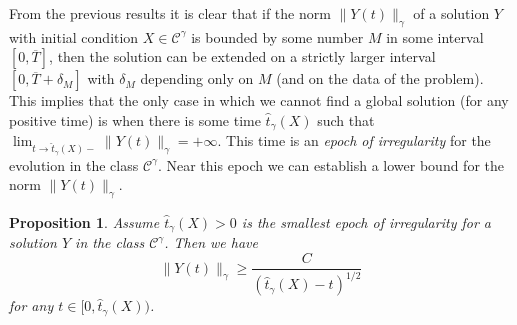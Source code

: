 \documentclass[a4paper,12pt,reqno]{amsart}
\newtheorem{proposition}{Proposition}
\newcommand{\CC}{\mathscr{C}}
\begin{document}
From the previous results it is clear that if the norm
$\|Y(t)\|_{\gamma}$ of a solution $Y$ with initial condition $X \in \CC^\gamma$ is bounded by some number $M$  in some interval
$[0,\overline T]$, then the solution can be extended on a strictly
larger interval $[0,\overline T + \delta_M]$ with $\delta_M$ depending
only on $M$ (and on the data of the problem). This implies that the
only case in which we cannot find a global solution (for any positive
time) is when there is some time $\hat t_\gamma(X)$ such that $\lim_{t\to \hat t_\gamma(X)
  -} \|Y(t)\|_{\gamma} = +\infty$. This time is an \emph{epoch of
  irregularity} for the evolution in the class $\CC^\gamma$. Near this epoch we can establish a
lower bound for the norm $\|Y(t)\|_{\gamma}$.

\begin{proposition}
\label{prop:blowup}
Assume $\hat t_\gamma(X)> 0$ is the smallest epoch of irregularity for a solution $Y$ in the class $\CC^\gamma$. Then we have
\begin{equation}
  \label{eq:blowup}
  \|Y(t)\|_{\gamma} \ge \frac{C}{(\hat t_\gamma(X) - t)^{1/2}}
\end{equation}
for any $t \in [0,\hat t_\gamma(X))$.
\end{proposition}
\end{document}
